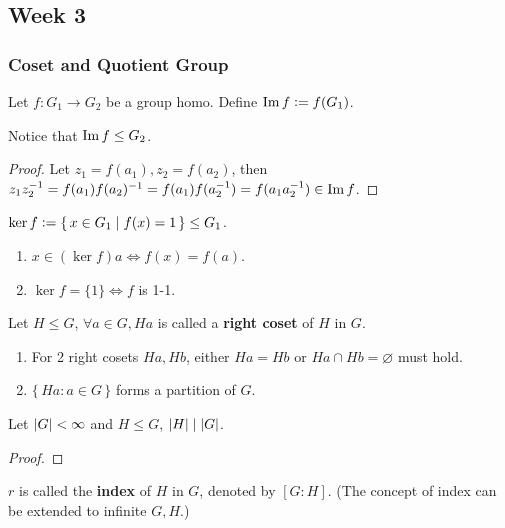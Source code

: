 \subsection{Week 3}
\subsubsection{Coset and Quotient Group}
Let $f: G_1 \to G_2$ be a group homo. Define $\operatorname{Im} f \vcentcolon= f(G_1)$.

Notice that $\operatorname{Im} f \le G_2$.
\begin{proof}
  Let $z_1 = f(a_1), z_2 = f(a_2)$, then
  $z_1z_2^{-1} = f(a_1)f(a_2)^{-1} = f(a_1)f(a_2^{-1}) = f(a_1a_2^{-1}) \in
  \operatorname{Im} f$.
\end{proof}

\begin{definition}
  $\ker f \vcentcolon= \{\, x \in G_1 \mid f(x) = 1 \,\} \le G_1$.
\end{definition}

\begin{fact} \mbox{}
  \begin{enumerate}
    \item $x \in (\ker f) a \iff f(x) = f(a)$.
    \item $\ker f = \{ 1 \} \iff f$ is 1-1.
  \end{enumerate}
\end{fact}

\begin{definition}
  Let $H \le G$, $\forall a \in G, Ha$ is called a {\bf right coset} of $H$
  in $G$.
\end{definition}

\begin{fact} \mbox{}
  \begin{enumerate}
    \item For 2 right cosets $Ha, Hb$, either $Ha = Hb$ or $Ha \cap Hb = \varnothing$
      must hold.
    \item $\{\, Ha : a\in G \,\}$ forms a partition of $G$.
  \end{enumerate}
\end{fact}

\begin{theorem}[Lagrange]
  Let $\lvert G\rvert < \infty$ and $H \le G$, $\lvert H\rvert \mid \lvert G\rvert$.
  \begin{proof}
  \end{proof}
\end{theorem}

\begin{remark}
  $r$ is called the {\bf index} of $H$ in $G$, denoted by $[G:H]$.
  (The concept of index can be extended to infinite $G, H$.)
\end{remark}

